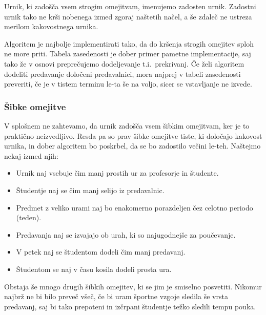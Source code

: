 \documentclass[a4paper, 10pt]{article}
\begin{document}
\noindent Urnik, ki zadošča vsem strogim omejitvam, imenujemo zadosten urnik. Zadostni urnik tako ne
krši nobenega izmed zgoraj naštetih načel, a še zdaleč ne ustreza merilom kakovostnega urnika.

Algoritem je najbolje implementirati tako, da do kršenja strogih omejitev sploh ne more priti.
Tabela zasedenosti je dober primer pametne implementacije, saj tako že v osnovi  preprečujemo
dodeljevanje t.i.\  prekrivanj. Če želi algoritem dodeliti predavanje določeni predavalnici,
mora najprej v tabeli zasedenosti preveriti, če je v tistem terminu le-ta še na voljo,
sicer se vstavljanje ne izvede.

\subsubsection{Šibke omejitve}

V splošnem ne zahtevamo, da urnik zadošča vsem šibkim omejitvam, ker je to praktično neizvedljivo.
Resda pa so prav šibke omejitve tiste, ki določajo kakovost urnika, in dober algoritem bo
poskrbel, da se bo zadostilo večini le-teh. Naštejmo nekaj izmed njih:

\begin{itemize}
   \item Urnik naj vsebuje čim manj prostih ur za profesorje in študente.
   \item Študentje naj se čim manj selijo iz predavalnic.
   \item Predmet z veliko urami naj bo enakomerno porazdeljen čez celotno periodo (teden).
   \item Predavanja naj se izvajajo ob urah, ki so najugodnejše za poučevanje.
   \item V petek naj se študentom dodeli čim manj predavanj.
   \item Študentom se naj v času kosila dodeli prosta ura.
\end{itemize}

\noindent Obstaja še mnogo drugih šibkih omejitev, ki se jim je smiselno posvetiti. Nikomur najbrž ne
bi bilo preveč všeč, če bi uram športne vzgoje sledila še vrsta predavanj, saj bi tako
prepoteni in izčrpani študentje težko sledili tempu pouka.
\end{document}

